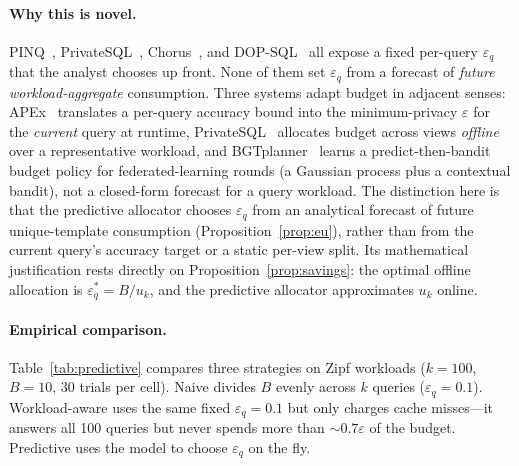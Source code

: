 \documentclass[sigconf,nonacm]{acmart}
\newcommand{\eps}{\varepsilon}
\begin{document}
\paragraph{Why this is novel.}
PINQ~\cite{mcsherry2009privacy}, PrivateSQL~\cite{kotsogiannis2019privatesql}, Chorus~\cite{johnson2020chorus}, and DOP-SQL~\cite{yu2024dopsql} all expose a fixed per-query $\eps_q$ that the analyst chooses up front. None of them set $\eps_q$ from a forecast of \emph{future workload-aggregate} consumption. Three systems adapt budget in adjacent senses: APEx~\cite{ge2019apex} translates a per-query accuracy bound into the minimum-privacy $\eps$ for the \emph{current} query at runtime, PrivateSQL~\cite{kotsogiannis2019privatesql} allocates budget across views \emph{offline} over a representative workload, and BGTplanner~\cite{zhang2024bgtplanner} learns a predict-then-bandit budget policy for federated-learning rounds (a Gaussian process plus a contextual bandit), not a closed-form forecast for a query workload. The distinction here is that the predictive allocator chooses $\eps_q$ from an analytical forecast of future unique-template consumption (Proposition~\ref{prop:eu}), rather than from the current query's accuracy target or a static per-view split. Its mathematical justification rests directly on Proposition~\ref{prop:savings}: the optimal offline allocation is $\eps_q^* = B/u_k$, and the predictive allocator approximates $u_k$ online.

\paragraph{Empirical comparison.}
Table~\ref{tab:predictive} compares three strategies on Zipf workloads ($k=100$, $B=10$, 30 trials per cell). Naive divides $B$ evenly across $k$ queries ($\eps_q=0.1$). Workload-aware uses the same fixed $\eps_q=0.1$ but only charges cache misses---it answers all 100 queries but never spends more than $\sim 0.7\eps$ of the budget. Predictive uses the model to choose $\eps_q$ on the fly.
\end{document}
